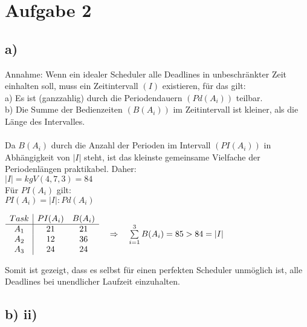 \documentclass[a4paper,11pt,parskip=half]{scrartcl}
\begin{document}
\section*{Aufgabe 2}

\subsection*{a)}
Annahme: Wenn ein idealer Scheduler alle Deadlines in unbeschränkter Zeit einhalten soll, muss ein Zeitintervall \((I)\) existieren, für das gilt: \\
a) Es ist (ganzzahlig) durch die Periodendauern \((Pd(A_i))\) teilbar. \\
b) Die Summe der Bedienzeiten \((B(A_i))\) im Zeitintervall ist kleiner, als die Länge des Intervalles. \\
\\
Da \(B(A_i)\) durch die Anzahl der Perioden im Intervall \((PI(A_i))\) in Abhängigkeit von \(|I|\) steht, ist das kleinste gemeinsame Vielfache der Periodenlängen praktikabel. Daher:\\ 
\(|I| = kgV(4,7,3) = 84 \) \\ \newpage
Für \(PI(A_i)\) gilt: \\
\(PI(A_i) = |I|: Pd(A_i)\) \\
\begin{center}
\(
\begin{array}{c | c c}
	Task & PI(A_i) & B(A_i) \\ \hline
	A_1  & 21 & 21 \\
	A_2  & 12 & 36 \\ 
	A_3  & 24 & 24
\end{array}\quad \Rightarrow \quad
 \sum\limits_{i=1}^3B(A_i) = 85 > 84 = |I|
\)
\end{center}
Somit ist gezeigt, dass es selbst für einen perfekten Scheduler unmöglich ist, alle Deadlines bei unendlicher Laufzeit einzuhalten.

\subsection*{b) ii)}
\begin{blockgraph}{25}{1}{0.5}
    
\end{blockgraph}
\end{document}
